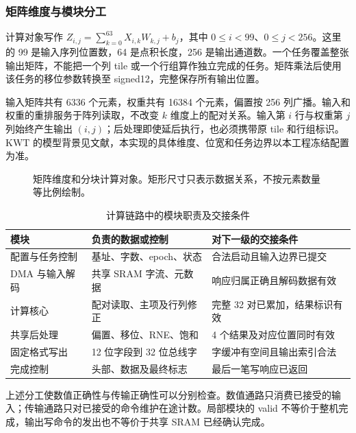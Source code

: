 \subsubsection{矩阵维度与模块分工}
计算对象写作 $Z_{i,j}=\sum_{k=0}^{63}X_{i,k}W_{k,j}+b_j$，其中 $0\le i<99$、$0\le j<256$。这里的 99 是输入序列位置数，64 是点积长度，256 是输出通道数。一个任务覆盖整张输出矩阵，不能把一个列 tile 或一个行组算作独立完成的任务。矩阵乘法后使用该任务的移位参数转换至 signed12，完整保存所有输出位置。

输入矩阵共有 6336 个元素，权重共有 16384 个元素，偏置按 256 列广播。输入和权重的重排服务于阵列读取，不改变 $k$ 维度上的配对关系。输入第 $i$ 行与权重第 $j$ 列始终产生输出 $(i,j)$；后处理即使延后执行，也必须携带原 tile 和行组标识。KWT 的模型背景见文献\cite{kwt}，本实现的具体维度、位宽和任务边界以本工程冻结配置为准。

\begin{figure}[H]\centering
{}
\caption{矩阵维度和分块计算对象。矩形尺寸只表示数据关系，不按元素数量等比例绘制。}
\end{figure}

\begin{table}[H]\centering\small
\caption{计算链路中的模块职责及交接条件}
\begin{tabularx}{\linewidth}{p{34mm}YY}\toprule
模块 & 负责的数据或控制 & 对下一级的交接条件\\\midrule
配置与任务控制 & 基址、字数、epoch、状态 & 合法启动且输入边界已提交\\
DMA 与输入解码 & 共享 SRAM 字流、元数据 & 响应归属正确且解码数据有效\\
计算核心 & 配对读取、主项及行列修正 & 完整 32 对已累加，结果标识有效\\
共享后处理 & 偏置、移位、RNE、饱和 & 4 个结果及对应位置同时有效\\
固定格式写出 & 12 位字段到 32 位总线字 & 字缓冲有空间且输出索引合法\\
完成控制 & 头部、数据及最终标志 & 最后一笔写响应已返回\\\bottomrule
\end{tabularx}
\end{table}

上述分工使数值正确性与传输正确性可以分别检查。数值通路只消费已接受的输入；传输通路只对已接受的命令维护在途计数。局部模块的 valid 不等价于整机完成，输出写命令的发出也不等价于共享 SRAM 已经确认完成。
